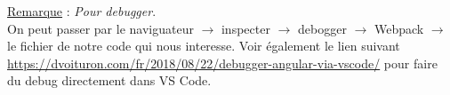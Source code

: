 \documentclass[a4paper,12pt,twoside]{article}
\newcommand{\rem}[2]{\noindent\underline{Remarque} : \textit{#1}.\\ \indent #2}
\begin{document}
\rem{Pour debugger}{ On peut passer par le naviguateur $\to$ inspecter $\to$ debogger $\to$ Webpack $\to$ le fichier de notre code qui nous interesse. Voir également le lien suivant \url{https://dvoituron.com/fr/2018/08/22/debugger-angular-via-vscode/} pour faire du debug directement dans VS Code.}\\



\end{document}
